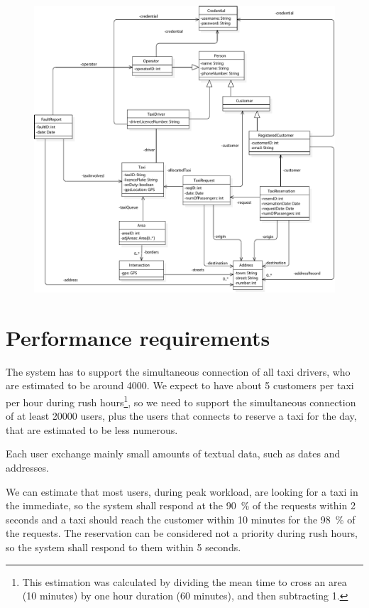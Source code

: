 \begin{figure}
	\includegraphics[width=\linewidth]{img/C_ClassDiagram.pdf}
\end{figure}


\section{Performance requirements}
The system has to support the simultaneous connection of all taxi drivers, who are estimated to be around \num{4000}. We expect to have about \num{5} customers per taxi per hour during rush hours\footnote{This estimation was calculated by dividing the mean time to cross an area (\num{10} minutes) by one hour duration (\num{60} minutes), and then subtracting \num{1}.}, so we need to support the simultaneous connection of at least \num{20000} users, plus the users that connects to reserve a taxi for the day, that are estimated to be less numerous.

Each user exchange mainly small amounts of textual data, such as dates and addresses.

We can estimate that most users, during peak workload, are looking for a taxi in the immediate, so the system shall respond at the \SI{90}{\percent} of the requests within \num{2} seconds and a taxi should reach the customer within \num{10} minutes for the \SI{98}{\percent} of the requests. The reservation can be considered not a priority during rush hours, so the system shall respond to them within \num{5} seconds.

